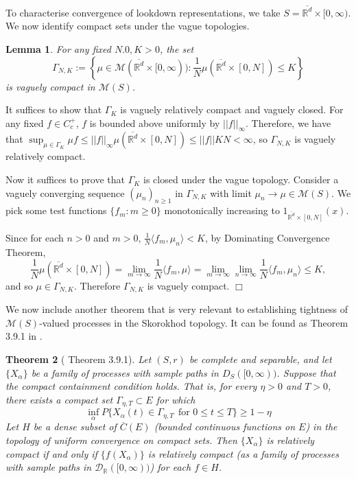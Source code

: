 \documentclass[12pt]{article}
\newenvironment {proof}{{\noindent\bf Proof }}{\hfill $\Box$ \medskip}
\newtheorem{theorem}{Theorem}[section]
\newtheorem{lemma}[theorem]{Lemma}
\begin{document}
To characterise convergence of lookdown representations,
we take $S = \overline{\mathbb{R}^d} \times [0,\infty)$.
We now identify compact sets under the vague topologies.

\begin{lemma}
\label{lem: vague compact sets}
For any fixed $N.0, K>0$, the set 
$$\Gamma_{N,K} := \left\{\mu \in \mathcal{M}(\overline{\mathbb{R}^d} \times [0,\infty)):  \frac{1}{N}\mu(\overline{\mathbb{R}^d}\times [0,N]) \leq K \right\}$$
is vaguely compact in $\mathcal{M}(S)$.
\end{lemma}

\begin{proof}
It suffices to show that $\Gamma_K$ is vaguely relatively compact and vaguely closed.
For any fixed $f \in C^{+}_c$, $f$ is bounded above uniformly by $||f||_{\infty}$.
Therefore, 
we have that $ \sup_{\mu \in  \Gamma_K} \mu f \leq  ||f||_{\infty} \mu(\overline{\mathbb{R}^d}\times [0,N])  \leq ||f|| K N < \infty$,
so $\Gamma_{N,K}$ is vaguely relatively compact.

Now it suffices to prove that $\Gamma_K$ is closed under the vague topology.
Consider a vaguely converging sequence $(\mu_n)_{n \geq 1}$ in $\Gamma_{N,K}$
with limit $\mu_n \to \mu \in \mathcal{M}(S)$.
We pick some test functions $\{f_m : m \geq 0 \}$ monotonically increasing to $1_{\overline{\mathbb{R}^d}\times[0,N]}(x)$.

Since for each $n>0$ and $m > 0$,
$\frac{1}{N}\langle f_m , \mu_n \rangle < K$,
by Dominating Convergence Theorem,
\begin{equation}
\frac{1}{N}\mu(\overline{\mathbb{R}^d}\times [0,N])
= \lim_{m \to \infty} \frac{1}{N}\langle f_m , \mu \rangle
=\lim_{m \to \infty} \lim_{n \to \infty} \frac{1}{N}\langle f_m , \mu_n \rangle
\leq K,
\end{equation}
and so $\mu \in \Gamma_{N,K}$.
Therefore $\Gamma_{N,K}$ is vaguely compact. 
\end{proof}


We now include another theorem that is very relevant to establishing tightness of $\mathcal{M}(S)$-valued processes in the Skorokhod topology. It can be found as Theorem 3.9.1 in \cite{EK}.

\begin{theorem}[\cite{EK} Theorem 3.9.1]
\label{teo: EK tightness theorem}
Let $(S,r)$ be complete and separable, and let $\{X_{\alpha}\}$ be a family of processes with sample paths in $D_{S}([0,\infty))$.
Suppose that the compact containment condition holds. That is, for every $\eta > 0$ and $T > 0$,
there exists a compact set $\Gamma_{\eta, T} \subset E$ for which 
\begin{equation}
\inf_{\alpha} P \{ X_{\alpha}(t) \in \Gamma_{\eta,T}  ~~ \text{for } 0\leq t \leq T\} \geq 1- \eta
\end{equation}
Let $H$ be a dense subset of $\overline{C}(E)$ (bounded continuous functions on $E$) in the topology of uniform convergence on compact sets. 
Then $\{X_{\alpha}\}$ is relatively compact if and only if $\{f(X_{\alpha})\}$ is relatively compact (as a family of processes with sample paths in $\mathcal{D}_{\mathbb{R}}([0,\infty))$) for each $f \in H$.
\end{theorem}
\end{document}

